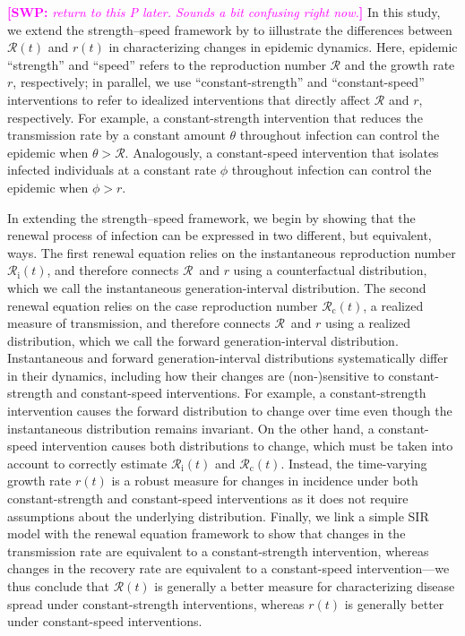 \documentclass[12pt]{article}
\newcommand{\comment}{\showcomment}
\newcommand{\showcomment}[3]{\textcolor{#1}{\textbf{[#2: }\textsl{#3}\textbf{]}}}
\newcommand{\swp}[1]{\comment{magenta}{SWP}{#1}}
\newcommand{\Rx}[1]{\ensuremath{{\mathcal R}_{#1}}\xspace}
\newcommand{\Rc}{\Rx{\mathrm{c}}}
\newcommand{\Ri}{\Rx{\mathrm{i}}}
\newcommand{\RR}{\ensuremath{{\mathcal R}}\xspace}
\begin{document}
\swp{return to this P later. Sounds a bit confusing right now.}
In this study, we extend the strength--speed framework by \cite{dushoff2021speed} to iillustrate the differences between $\RR(t)$ and $r(t)$ in characterizing changes in epidemic dynamics.
Here, epidemic ``strength'' and ``speed'' refers to the reproduction number $\RR$ and the growth rate $r$, respectively; 
in parallel, we use ``constant-strength'' and ``constant-speed'' interventions to refer to idealized interventions that directly affect $\RR$ and $r$, respectively. 
For example, a constant-strength intervention that reduces the transmission rate by a constant amount $\theta$ throughout infection can control the epidemic when $\theta > \RR$. 
Analogously, a constant-speed intervention that isolates infected individuals at a constant rate $\phi$ throughout infection can control the epidemic when $\phi > r$.

In extending the strength--speed framework, we begin by showing that the renewal process of infection can be expressed in two different, but equivalent, ways.
The first renewal equation relies on the instantaneous reproduction number $\Ri(t)$, and therefore connects \RR\ and $r$ using a counterfactual distribution, which we call the instantaneous generation-interval distribution.
The second renewal equation relies on the case reproduction number $\Rc(t)$, a realized measure of transmission, and therefore connects \RR\ and $r$ using a realized distribution, which we call the forward generation-interval distribution.
Instantaneous and forward generation-interval distributions systematically differ in their dynamics, including how their changes are (non-)sensitive to constant-strength and constant-speed interventions.
For example, a constant-strength intervention causes the forward distribution to change over time even though the instantaneous distribution remains invariant.
On the other hand, a constant-speed intervention causes both distributions to change, which must be taken into account to correctly estimate $\Ri(t)$ and $\Rc(t)$.
Instead, the time-varying growth rate $r(t)$ is a robust measure for changes in incidence under both constant-strength and constant-speed interventions as it does not require assumptions about the underlying distribution.
Finally, we link a simple SIR model with the renewal equation framework to show that changes in the transmission rate are equivalent to a constant-strength intervention, whereas changes in the recovery rate are equivalent to a constant-speed intervention---we thus conclude that $\RR(t)$ is generally a better measure for characterizing disease spread under constant-strength interventions, whereas $r(t)$ is generally better under constant-speed interventions.
\end{document}
